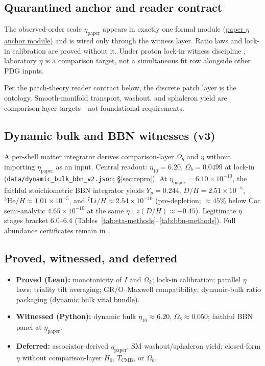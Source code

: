 \documentclass[11pt]{amsart}
\newcommand{\LeanEng}[2]{\hyperref[#1]{#2}}
\newcommand{\datafile}[1]{\texttt{#1}}
\begin{document}
\subsection{Quarantined anchor and reader contract}
The observed-order scale $\eta_{\mathrm{paper}}$ appears in exactly one
formal module (\LeanEng{lean:eta-paper}{paper $\eta$ anchor module}) and
is wired only through the witness layer. Ratio laws and lock-in
calibration are proved without it. Under proton lock-in witness discipline
\cite{hqiv-tuft-sm-lagrangian-paper,hqiv-kirchhoff-paper}, laboratory
$\eta$ is a comparison target, not a simultaneous fit row alongside other
PDG inputs.

Per the patch-theory reader contract below, the discrete patch layer is
the ontology. Smooth-manifold transport, washout, and sphaleron yield are
comparison-layer targets---not foundational requirements.

\subsection{Dynamic bulk and BBN witnesses (v3)}
A per-shell matter integrator derives comparison-layer $\Omega_b$ and
$\eta$ without importing $\eta_{\mathrm{paper}}$ as an input. Central
readout: $\eta_{10}=6.20$, $\Omega_b=0.0499$ at lock-in
(\datafile{data/dynamic\_bulk\_bbn\_v2.json}; \S\ref{sec:repro}). At
$\eta_{\mathrm{paper}}=6.10\times 10^{-10}$, the faithful stoichiometric
BBN integrator yields $Y_p=0.244$, $D/H=2.51\times 10^{-5}$,
$^3\mathrm{He}/H\approx 1.01\times 10^{-5}$, and
$^7\mathrm{Li}/H\approx 2.54\times 10^{-10}$ (pre-depletion;
$\approx 45\%$ below Coc semi-analytic $4.65\times 10^{-10}$ at the same
$\eta$ \cite{coc2015}; $z(D/H)\approx -0.45$). Legitimate $\eta$ stages
bracket $6.0$--$6.4$ (Tables~\ref{tab:eta-methods}--\ref{tab:bbn-methods}).
Full abundance certificates remain in \cite{hqiv-bbn-paper}.

\subsection{Proved, witnessed, and deferred}
\begin{itemize}[leftmargin=2em,nosep]
\item \textbf{Proved (Lean):} monotonicity of $I$ and $\Omega_k$; lock-in
  calibration; parallel $\eta$ laws; triality tilt averaging; GR/O--Maxwell
  compatibility; dynamic-bulk ratio packaging
  (\LeanEng{lean:dynamic-bulk-vital}{dynamic bulk vital bundle}).
\item \textbf{Witnessed (Python):} dynamic bulk $\eta_{10}\approx 6.20$,
  $\Omega_b\approx 0.050$; faithful BBN panel at $\eta_{\mathrm{paper}}$.
\item \textbf{Deferred:} associator-derived $\eta_{\mathrm{paper}}$; SM
  washout/sphaleron yield; closed-form $\eta$ without comparison-layer
  $H_0$, $T_{\mathrm{CMB}}$, or $\Omega_b$.
\end{itemize}
\end{document}

